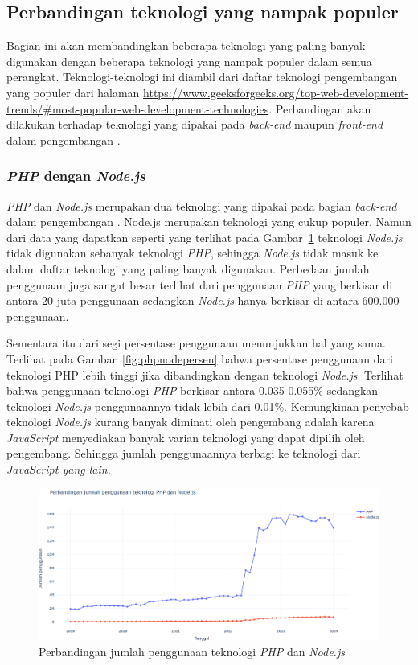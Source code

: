 \subsection{Perbandingan teknologi yang nampak populer}
\label{subsec:teknologipopulerlain}

Bagian ini akan membandingkan beberapa teknologi yang paling banyak digunakan dengan beberapa teknologi yang nampak populer dalam semua perangkat. Teknologi-teknologi ini diambil dari daftar teknologi pengembangan \web yang populer dari halaman \url{https://www.geeksforgeeks.org/top-web-development-trends/#most-popular-web-development-technologies}. Perbandingan akan dilakukan terhadap teknologi yang dipakai pada \textit{back-end} maupun \textit{front-end} dalam pengembangan \web.

\subsubsection{\textit{PHP} dengan \textit{Node.js}}
\label{subsubsec:phpnode}

\textit{PHP} dan \textit{Node.js} merupakan dua teknologi yang dipakai pada bagian \textit{back-end} dalam pengembangan \web. Node.js merupakan teknologi yang cukup populer. Namun dari data yang dapatkan seperti yang terlihat pada Gambar~\ref{fig:phpnode} teknologi \textit{Node.js} tidak digunakan sebanyak teknologi \textit{PHP}, sehingga \textit{Node.js} tidak masuk ke dalam daftar teknologi yang paling banyak digunakan. Perbedaan jumlah penggunaan juga sangat besar terlihat dari penggunaan \textit{PHP} yang berkisar di antara 20 juta penggunaan sedangkan \textit{Node.js} hanya berkisar di antara 600.000 penggunaan.

Sementara itu dari segi persentase penggunaan menunjukkan hal yang sama. Terlihat pada Gambar~\ref{fig:phpnodepersen} bahwa persentase penggunaan dari teknologi PHP lebih tinggi jika dibandingkan dengan teknologi \textit{Node.js}. Terlihat bahwa penggunaan teknologi \textit{PHP} berkisar antara 0.035-0.055\% sedangkan teknologi \textit{Node.js} penggunaannya tidak lebih dari 0.01\%. Kemungkinan penyebab teknologi \textit{Node.js} kurang banyak diminati oleh pengembang \web adalah karena \textit{JavaScript} menyediakan banyak varian teknologi yang dapat dipilih oleh pengembang. Sehingga jumlah penggunaannya terbagi ke teknologi dari \textit{JavaScript yang lain.}

\begin{figure}[H]
    \centering
    \includegraphics[width=0.7\linewidth]{Gambar/perbandinganphpnode.png}
    \caption{Perbandingan jumlah penggunaan teknologi \textit{PHP} dan \textit{Node.js}}
    \label{fig:phpnode}
\end{figure}


